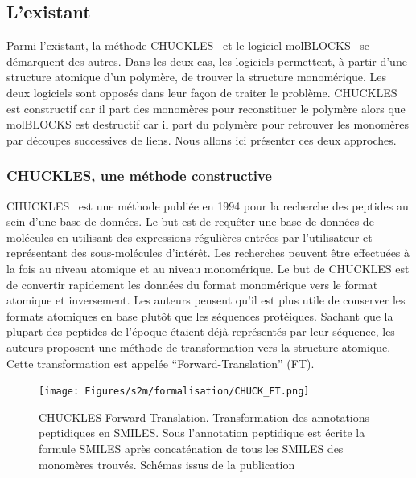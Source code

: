 \subsection{L'existant}

Parmi l'existant, la méthode CHUCKLES~\cite{siani_chuckles:_1994} et le logiciel molBLOCKS~\cite{ghersi_molblocks:_2014} se démarquent des autres.
Dans les deux cas, les logiciels permettent, à partir d'une structure atomique d'un polymère, de trouver la structure monomérique.
Les deux logiciels sont opposés dans leur façon de traiter le problème.
CHUCKLES est constructif car il part des monomères pour reconstituer le polymère alors que molBLOCKS est destructif car il part du polymère pour retrouver les monomères par découpes successives de liens.
Nous allons ici présenter ces deux approches.


\subsubsection{CHUCKLES, une méthode constructive}

CHUCKLES~\cite{siani_chuckles:_1994} est une méthode publiée en 1994 pour la recherche des peptides au sein d'une base de données.
Le but est de requêter une base de données de molécules en utilisant des expressions régulières entrées par l'utilisateur et représentant des sous-molécules d'intérêt.
Les recherches peuvent être effectuées à la fois au niveau atomique et au niveau monomérique.
Le but de CHUCKLES est de convertir rapidement les données du format monomérique vers le format atomique et inversement.
Les auteurs pensent qu'il est plus utile de conserver les formats atomiques en base plutôt que les séquences protéiques.
Sachant que la plupart des peptides de l'époque étaient déjà représentés par leur séquence, les auteurs proposent une méthode de transformation vers la structure atomique.
Cette transformation est appelée ``Forward-Translation'' (FT).

\begin{figure}[!ht]
  \begin{center}
    \texttt{[image: Figures/s2m/formalisation/CHUCK\_FT.png]}
    \caption{\label{chuck_ft}CHUCKLES Forward Translation.
    Transformation des annotations peptidiques en SMILES.
    Sous l'annotation peptidique est écrite la formule SMILES après concaténation de tous les SMILES des monomères trouvés.
    Schémas issus de la publication}
  \end{center}
\end{figure}

